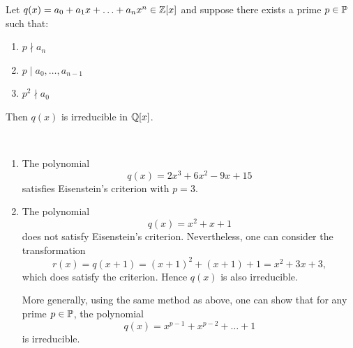 \begin{lemma}
    Let $q(x) = a_0 + a_1 x + \ldots + a_n x^n \in \Z[x]$ and suppose there exists a prime $p \in \P$ such that:
    \begin{enumerate}
        \item $p \nmid a_n$
        \item $p \mid a_0, \ldots, a_{n-1}$
        \item $p^2 \nmid a_0$
    \end{enumerate}
    Then $q(x)$ is irreducible in $\Q[x]$.
\end{lemma}

\begin{example}{\ }
    \begin{enumerate}
        \item The polynomial
        \[
            q(x) = 2x^3 + 6x^2 - 9x + 15
        \]
        satisfies Eisenstein's criterion with $p=3$.

        \item The polynomial
        \[
            q(x) = x^2 + x + 1
        \]
        does not satisfy Eisenstein's criterion. Nevertheless, one can consider the transformation
        \[
            r(x) = q(x+1) = (x+1)^2 + (x+1) + 1 = x^2 + 3x + 3,
        \]
        which does satisfy the criterion. Hence $q(x)$ is also irreducible.
        
        More generally, using the same method as above, one can show that for any prime $p \in \P$, the polynomial
        \[
            q(x) = x^{p-1} + x^{p-2} + \ldots + 1
        \]
        is irreducible.
    \end{enumerate}
\end{example}